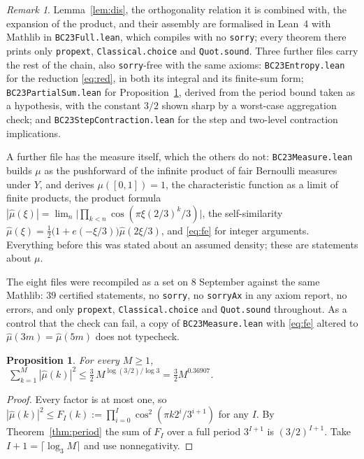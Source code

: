 \documentclass[11pt]{article}
\newtheorem{proposition}[theorem]{Proposition}
\theoremstyle{remark}
\newtheorem*{remark}{Remark}
\begin{document}
\begin{remark}
Lemma~\ref{lem:dis}, the orthogonality relation it is combined with, the expansion of the product, and
their assembly are formalised in Lean~4 with Mathlib in \texttt{BC23Full.lean}, which compiles with no
\texttt{sorry}; every theorem there prints only \texttt{propext}, \texttt{Classical.choice} and
\texttt{Quot.sound}. Three further files carry the rest of the chain, also \texttt{sorry}-free with the
same axioms: \texttt{BC23Entropy.lean} for the reduction \eqref{eq:red}, in both its integral and its
finite-sum form; \texttt{BC23PartialSum.lean} for Proposition~\ref{prop:partial}, derived from the period
bound taken as a hypothesis, with the constant $3/2$ shown sharp by a worst-case aggregation check; and
\texttt{BC23Step\-Contraction.lean} for the step and two-level contraction implications.

A further file has the measure itself, which the others do not: \texttt{BC23Measure.lean} builds $\mu$ as
the pushforward of the infinite product of fair Bernoulli measures under $Y$, and derives
$\mu([0,1])=1$, the characteristic function as a limit of finite products, the product formula
$|\hat\mu(\xi)|=\lim_n\bigl|\prod_{k<n}\cos(\pi\xi(2/3)^k/3)\bigr|$, the self-similarity
$\hat\mu(\xi)=\tfrac12\bigl(1+e(-\xi/3)\bigr)\hat\mu(2\xi/3)$, and \eqref{eq:fe} for integer arguments.
Everything before this was stated about an assumed density; these are statements about $\mu$.

The eight files were recompiled as a set on 8 September against the same Mathlib: $39$ certified
statements, no \texttt{sorry}, no \texttt{sorryAx} in any axiom report, no errors, and only
\texttt{propext}, \texttt{Classical.choice} and \texttt{Quot.sound} throughout. As a control that the
check can fail, a copy of \texttt{BC23Measure.lean} with \eqref{eq:fe} altered to
$\hat\mu(3m)=\hat\mu(5m)$ does not typecheck.
\end{remark}

\begin{proposition}\label{prop:partial}
For every $M\ge1$, $\ \sum_{k=1}^{M}|\hat\mu(k)|^2\le\tfrac32\,M^{\log(3/2)/\log3}=\tfrac32M^{0.36907}$.
\end{proposition}

\begin{proof}
Every factor is at most one, so $|\hat\mu(k)|^2\le F_I(k):=\prod_{i=0}^{I}\cos^2(\pi k2^i/3^{i+1})$ for
any $I$. By Theorem~\ref{thm:period} the sum of $F_I$ over a full period $3^{I+1}$ is $(3/2)^{I+1}$.
Take $I+1=\lceil\log_3M\rceil$ and use nonnegativity.
\end{proof}
\end{document}
